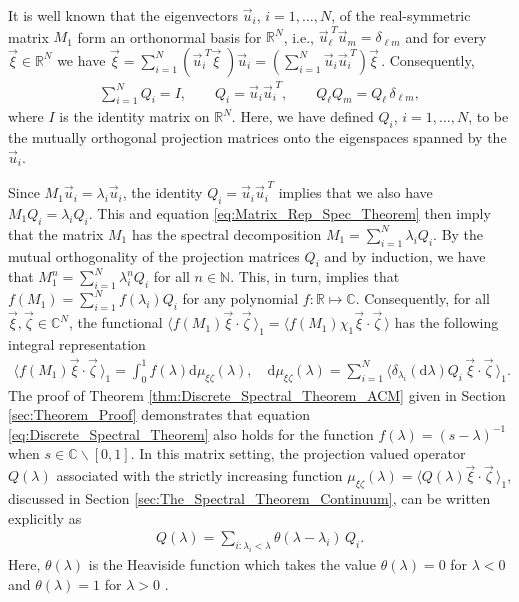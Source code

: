 \documentclass{cmslatex}
\renewcommand{\d}{\text{d}}
\begin{document}
It is well known \cite{Horn_Johnson-1990,Keener-2000} that the
eigenvectors $\vec{u}_i$, 
$i=1,\ldots,N$, of the real-symmetric matrix $M_1$ form an orthonormal basis for
$\mathbb{R}^N$, i.e., $\vec{u}_\ell^{\;T}\vec{u}_m=\delta_{\ell m}$  and for every
$\vec{\xi}\in\mathbb{R}^N$ we have
$\vec{\xi}=\sum_{i=1}^N(\vec{u}_i^{\;T}\vec{\xi}\;)\vec{u}_i
=\left(\sum_{i=1}^N\vec{u}_i\vec{u}_i^{\;T}\right)\vec{\xi}\,$. Consequently,         
%
\begin{align}\label{eq:Matrix_Rep_Spec_Theorem}
  \sum_{i=1}^NQ_i=I, \qquad
  Q_i=\vec{u}_i\vec{u}_i^{\;T},  \qquad
  Q_\ell Q_m=Q_\ell\,\delta_{\ell m},
\end{align}
%
where $I$ is the identity matrix on $\mathbb{R}^N$. Here, we have
defined $Q_i$, $i=1,\ldots,N$, to be the mutually orthogonal projection
matrices onto the eigenspaces spanned by the $\vec{u}_i$.




Since $M_1\vec{u}_i=\lambda_i\vec{u}_i$, the identity $Q_i=\vec{u}_i\vec{u}_i^{\;T}$
implies that we also have $M_1Q_i=\lambda_iQ_i$. This and equation
\eqref{eq:Matrix_Rep_Spec_Theorem} then imply that the matrix  $M_1$
has the spectral decomposition $M_1=\sum_{i=1}^N\lambda_iQ_i$. By the mutual
orthogonality of the projection matrices $Q_i$ and by induction, we
have that  
$M_1^n=\sum_{i=1}^N\lambda_i^nQ_i$ for all $n\in\mathbb{N}$. This, in turn,
implies that $f(M_1)=\sum_{i=1}^Nf(\lambda_i)Q_i$ for any polynomial
$f:\mathbb{R}\mapsto\mathbb{C}$.  Consequently, for all
$\vec{\xi},\vec{\zeta}\in\mathbb{C}^N$, the functional
$\langle f(M_1)\vec{\xi}\cdot\vec{\zeta}\,\rangle_1=\langle f(M_1)\chi_1\vec{\xi}\cdot\vec{\zeta}\,\rangle$ has the
following integral representation
%
\begin{align}\label{eq:Discrete_Spectral_Theorem}
  \langle f(M_1)\vec{\xi}\cdot\vec{\zeta}\,\rangle_1= \int_0^1f(\lambda)\d\mu_{\xi\zeta}(\lambda), \quad
  \d\mu_{\xi\zeta}(\lambda)=\sum_{i=1}^N\langle\delta_{\lambda_i}(\d\lambda)Q_i\,\vec{\xi}\cdot\vec{\zeta}\,\rangle_1.
\end{align}
%
The proof of Theorem \ref{thm:Discrete_Spectral_Theorem_ACM} given in
Section \ref{sec:Theorem_Proof} demonstrates that equation
\eqref{eq:Discrete_Spectral_Theorem} also holds for the function
$f(\lambda)=(s-\lambda)^{-1}$ when $s\in\mathbb{C}\backslash[0,1]$. In this matrix setting,
the projection valued operator $Q(\lambda)$ associated with the strictly
increasing function  $\mu_{\xi\zeta}(\lambda)=\langle Q(\lambda)\vec{\xi}\cdot\vec{\zeta}\,\rangle_1$, discussed
in Section \ref{sec:The_Spectral_Theorem_Continuum}, can be written
explicitly as 
% 
\begin{align}
  Q(\lambda)=\sum_{i:\lambda_i<\lambda}\theta(\lambda-\lambda_i)\,Q_i.
\end{align}
%
Here, $\theta(\lambda)$ is the Heaviside function which takes the value $\theta(\lambda)=0$
for $\lambda<0$ and $\theta(\lambda)=1$ for $\lambda>0$ \cite{Keener-2000}. 
\end{document}
